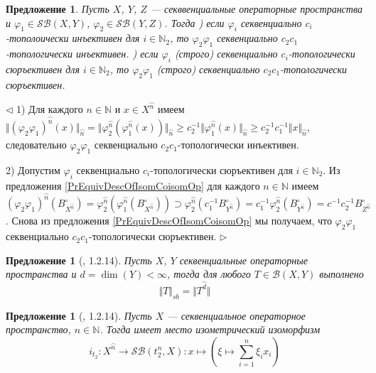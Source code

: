 \documentclass[12pt]{article}
\newtheorem{proposition}[theorem]{Предложение}
\newenvironment{proof}{\par $\triangleleft$}{$\triangleright$}
\begin{document}
\begin{proposition}\label{PrComposeSQTopInjSur} Пусть $X$, $Y$, $Z$ --- секввенциальные операторные пространства и $\varphi_1\in\mathcal{SB}(X,Y)$, $\varphi_2\in\mathcal{SB}(Y,Z)$. Тогда
) если $\varphi_i$ секвенциально $c_i$-тополоически инъективен для $i\in\mathbb{N}_2$, то $\varphi_2\varphi_1$ секвенциально $c_2c_1$-топологически инъективен.
) если $\varphi_i$ (строго) секвенциально $c_i$-топологически сюръективен для $i\in\mathbb{N}_2$, то $\varphi_2\varphi_1$ (строго) секвенциально $c_2c_1$-топологически сюръективен.
\end{proposition}
\begin{proof}
1) Для каждого $n\in\mathbb{N}$ и $x\in X^{\wideparen{n}}$ имеем $\Vert(\varphi_2\varphi_1)^{\wideparen{n}}(x)\Vert_{\wideparen{n}}=\Vert\varphi_2^{\wideparen{n}}(\varphi_1^{\wideparen{n}}(x))\Vert_{\wideparen{n}}
\geq c_2^{-1}\Vert\varphi_1^{\wideparen{n}}(x)\Vert_{\wideparen{n}}\geq c_2^{-1}c_1^{-1}\Vert x\Vert_{\wideparen{n}}$, следовательно $\varphi_2\varphi_1$ секвенциально $c_2c_1$-топологически инъективен.

2) Допустим $\varphi_i$ секвенциально $c_i$-топологически сюръективен для $i\in\mathbb{N}_2$. Из предложения \ref{PrEquivDescOfIsomCoisomOp} для каждого $n\in\mathbb{N}$ имеем $(\varphi_2\varphi_1)^{\wideparen{n}}(B_{X^{\wideparen{n}}}^\circ)=\varphi_2^{\wideparen{n}}(\varphi_1^{\wideparen{n}}(B_{X^{\wideparen{n}}}^\circ))\supset\varphi_2^{\wideparen{n}}(c_1^{-1}B_{Y^{\wideparen{n}}}^\circ)=c_1^{-1}\varphi_2^{\wideparen{n}}(B_{Y^{\wideparen{n}}}^\circ)=c^{-1}c_2^{-1}B_{Z^{\wideparen{n}}}^\circ$. Снова из предложения \ref{PrEquivDescOfIsomCoisomOp} мы получаем, что $\varphi_2\varphi_1$ секвенциально $c_2c_1$-топологически сюръективен.
\end{proof}


\begin{proposition}[\cite{LamOpFolgen}, 1.2.14]\label{PrSmithsLemma}
Пусть $X$, $Y$ секвенциальные операторные пространства и $d=\operatorname{dim}(Y)<\infty$, тогда для любого $T\in\mathcal{B}(X,Y)$ выполнено
$$
\Vert T\Vert_{sb}=\Vert T^{\wideparen{d}}\Vert
$$
\end{proposition}

\begin{proposition}[\cite{LamOpFolgen}, 1.2.14]\label{PrSQSpaceIsSBFromT2n}
Пусть $X$ --- секвенциальное операторное пространство, $n\in\mathbb{N}$. Тогда имеет место изометрический изоморфизм 
$$
i_{t_2}:X^{\wideparen{n}}\to\mathcal{SB}(t^n_2, X):x\mapsto\left(\xi\mapsto\sum\limits_{i=1}^n\xi_ix_i\right)
$$
\end{proposition}
\end{document}
